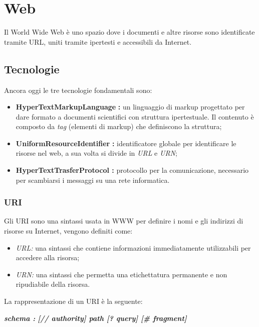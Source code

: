 \section{Web}\label{web}

Il World Wide Web è uno spazio dove i documenti e altre risorse sono
identificate tramite URL, uniti tramite ipertesti e accessibili da
Internet.

\subsection{Tecnologie}\label{tecnologie}

Ancora oggi le tre tecnologie fondamentali sono:

\begin{itemize}
\item
  \textbf{HyperTextMarkupLanguage} \textbf{:} un linguaggio di markup
  progettato per dare formato a documenti scientifici con struttura
  ipertestuale. Il contenuto è composto da \emph{tag} (elementi di
  markup) che definiscono la struttura;
\item
  \textbf{UniformResourceIdentifier} \textbf{:} identificatore globale
  per identificare le risorse nel web, a sua volta si divide in
  \emph{URL} e \emph{URN};
\item
  \textbf{HyperTextTrasferProtocol :} protocollo per la comunicazione,
  necessario per scambiarsi i messaggi su una rete informatica.
\end{itemize}

\subsubsection{URI}\label{uri}

Gli URI sono una sintassi usata in WWW per definire i nomi e gli
indirizzi di risorse su Internet, vengono definiti come:

\begin{itemize}
\item
  \emph{URL:} una sintassi che contiene informazioni immediatamente
  utilizzabili per accedere alla risorsa;
\item
  \emph{URN:} una sintassi che permetta una etichettatura permanente e
  non ripudiabile della risorsa.
\end{itemize}

La rappresentazione di un URI è la seguente:

\emph{\textbf{schema :} \textbf{{[}// authority{]} path {[}? query{]}
{[}\# fragment{]}}}

